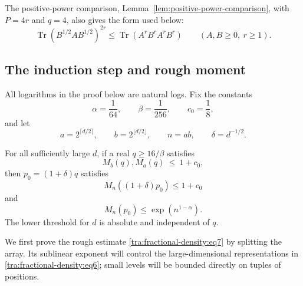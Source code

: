 The positive-power comparison, Lemma~\ref{lem:positive-power-comparison},
with $P=4r$ and $q=4$, also gives the form used below:
\begin{equation}
 \operatorname{Tr}(B^{1/2}AB^{1/2})^{2r}
 \le\operatorname{Tr}(A^rB^rA^rB^r)
 \qquad(A,B\ge0,\ r\ge1).
 \label{tra:fractional-density:eq4}
\end{equation}

\subsection{The induction step and rough moment}

\label{tra:fractional-density:induction-budgets}
All logarithms in the proof below are natural logs. Fix the constants
\[
 \alpha=\frac{1}{64},\qquad \beta=\frac{1}{256},\qquad c_0=\frac18,
\]
and let
\[
 a=2^{\lceil d/2\rceil},\qquad b=2^{\lfloor d/2\rfloor},\qquad
 n=ab,\qquad \delta=d^{-1/2}.
\]

\begin{proposition}\label{tra:fractional-density:step}

\label{tra:fractional-density:step-and-rough-moment}
For all sufficiently large \(d\), if a real \(q\ge16/\beta\) satisfies
\begin{equation}
 M_b(q), M_a(q) \ \le\ 1+c_0,
 \label{tra:fractional-density:eq5}
\end{equation}
then \(p_0=(1+\delta)q\) satisfies
\begin{equation}
 M_n((1+\delta)p_0)\le 1+c_0
 \label{tra:fractional-density:eq6}
\end{equation}
and
\begin{equation}
 M_n(p_0)\le \exp(n^{1-\alpha}).
 \label{tra:fractional-density:eq7}
\end{equation}
The lower threshold for $d$ is absolute and independent of $q$.

\end{proposition}

We first prove the rough estimate \eqref{tra:fractional-density:eq7}
by splitting the array. Its sublinear exponent will control the
large-dimensional representations in \eqref{tra:fractional-density:eq6};
small levels will be bounded directly on tuples of positions.

